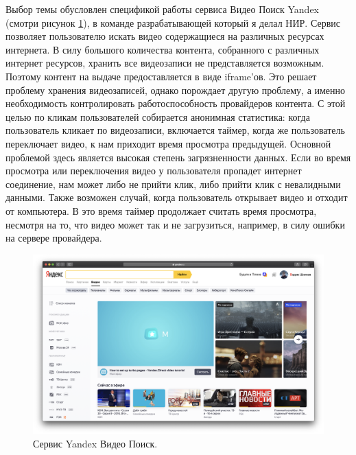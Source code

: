 




Выбор темы обусловлен спецификой работы сервиса Видео Поиск Yandex (смотри рисунок \ref{fig:yandex_video}), в команде разрабатывающей который я делал НИР. Сервис позволяет пользователю искать видео содержащиеся на различных ресурсах интернета. В силу большого количества контента, собранного с различных интернет ресурсов, хранить все видеозаписи не представляется возможным. Поэтому контент на выдаче предоставляется в виде iframe'ов. Это решает проблему хранения видеозаписей, однако порождает другую проблему, а именно необходимость контролировать работоспособность провайдеров контента. С этой целью по кликам пользователей собирается анонимная статистика: когда пользователь кликает по видеозаписи, включается таймер, когда же пользователь переключает видео, к нам приходит время просмотра предыдущей. Основной проблемой здесь является высокая степень загрязненности данных. Если во время просмотра или переключения видео у пользователя пропадет интернет соединение, нам может либо не прийти клик, либо прийти клик с невалидными данными. Также возможен случай, когда пользователь открывает видео и отходит от компьютера. В это время таймер продолжает считать время просмотра, несмотря на то, что видео может так и не загрузиться, например, в силу ошибки на сервере провайдера.

\begin{figure}
    \centering
    \includegraphics[width=\textwidth]{images/yandex_video}
    \caption{Сервис Yandex Видео Поиск.}
    \label{fig:yandex_video}
\end{figure}

